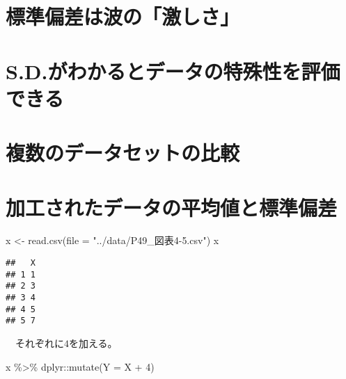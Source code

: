\documentclass[
  12pt,
]{book}
\newenvironment{Shaded}{\begin{snugshade}}{\end{snugshade}}
\newcommand{\AttributeTok}[1]{\textcolor[rgb]{0.77,0.63,0.00}{#1}}
\newcommand{\DecValTok}[1]{\textcolor[rgb]{0.00,0.00,0.81}{#1}}
\newcommand{\FunctionTok}[1]{\textcolor[rgb]{0.00,0.00,0.00}{#1}}
\newcommand{\NormalTok}[1]{#1}
\newcommand{\OtherTok}[1]{\textcolor[rgb]{0.56,0.35,0.01}{#1}}
\newcommand{\SpecialCharTok}[1]{\textcolor[rgb]{0.00,0.00,0.00}{#1}}
\newcommand{\StringTok}[1]{\textcolor[rgb]{0.31,0.60,0.02}{#1}}
\begin{document}
\hypertarget{ux6a19ux6e96ux504fux5deeux306fux6ce2ux306eux6fc0ux3057ux3055}{%
\section{標準偏差は波の「激しさ」}\label{ux6a19ux6e96ux504fux5deeux306fux6ce2ux306eux6fc0ux3057ux3055}}

\hypertarget{s.d.ux304cux308fux304bux308bux3068ux30c7ux30fcux30bfux306eux7279ux6b8aux6027ux3092ux8a55ux4fa1ux3067ux304dux308b}{%
\section{S.D.がわかるとデータの特殊性を評価できる}\label{s.d.ux304cux308fux304bux308bux3068ux30c7ux30fcux30bfux306eux7279ux6b8aux6027ux3092ux8a55ux4fa1ux3067ux304dux308b}}

\hypertarget{ux8907ux6570ux306eux30c7ux30fcux30bfux30bbux30c3ux30c8ux306eux6bd4ux8f03}{%
\section{複数のデータセットの比較}\label{ux8907ux6570ux306eux30c7ux30fcux30bfux30bbux30c3ux30c8ux306eux6bd4ux8f03}}

\hypertarget{ux52a0ux5de5ux3055ux308cux305fux30c7ux30fcux30bfux306eux5e73ux5747ux5024ux3068ux6a19ux6e96ux504fux5dee}{%
\section{加工されたデータの平均値と標準偏差}\label{ux52a0ux5de5ux3055ux308cux305fux30c7ux30fcux30bfux306eux5e73ux5747ux5024ux3068ux6a19ux6e96ux504fux5dee}}

\begin{Shaded}
\begin{Highlighting}[]
\NormalTok{x }\OtherTok{\textless{}{-}} \FunctionTok{read.csv}\NormalTok{(}\AttributeTok{file =} \StringTok{"../data/P49\_図表4{-}5.csv"}\NormalTok{)}
\NormalTok{x}
\end{Highlighting}
\end{Shaded}

\begin{verbatim}
##   X
## 1 1
## 2 3
## 3 4
## 4 5
## 5 7
\end{verbatim}

　それぞれに\(4\)を加える。

\begin{Shaded}
\begin{Highlighting}[]
\NormalTok{x }\SpecialCharTok{\%\textgreater{}\%} 
\NormalTok{  dplyr}\SpecialCharTok{::}\FunctionTok{mutate}\NormalTok{(}\AttributeTok{Y =}\NormalTok{ X }\SpecialCharTok{+} \DecValTok{4}\NormalTok{)}
\end{Highlighting}
\end{Shaded}
\end{document}
